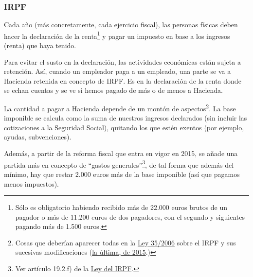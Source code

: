 \documentclass[nochap,palatino,shortheader]{apuntes}
\newcommand{\study}[1]{#1} \newcommand{\substudy}[1]{#1}
\begin{document}
\subsubsection{IRPF}

Cada año (más concretamente, cada ejercicio fiscal), las personas físicas deben hacer la declaración de la renta\footnote{Sólo es obligatorio habiendo recibido más de 22.000 euros brutos de un pagador o más de 11.200 euros de dos pagadores, con el segundo y siguientes pagando más de 1.500 euros.} y pagar un impuesto en base a los ingresos (renta) que haya tenido.

Para evitar el susto en la declaración, las actividades económicas están sujeta a retención. Así, cuando un empleador paga a un empleado, una parte se va a Hacienda retenida en concepto de IRPF\footnotemark.
Es en la declaración de la renta donde se echan cuentas y se ve si hemos pagado de más o de menos a Hacienda.


La cantidad a pagar a Hacienda depende de un montón de aspectos\footnote{Cosas que deberían aparecer todas en la \href{https://www.boe.es/buscar/act.php?id=BOE-A-2006-20764&tn=1&vd=&p=20151030}{Ley 35/2006} sobre el IRPF y sus sucesivas modificaciones (\href{http://www.boe.es/diario_boe/txt.php?id=BOE-A-2015-7765}{la última, de 2015}.)}.
La \study{base imponible} se calcula como la \substudy{suma de nuestros ingresos declarados (}\study{sin}\substudy{ incluir las cotizaciones a la }\study{Seguridad Social}), \substudy{quitando} los que estén exentos (por ejemplo, \substudy{ayudas}, subvenciones).

Además, a partir de la reforma fiscal que entra en vigor en 2015, se añade una partida más en concepto de ``gastos generales''\footnote{Ver artículo 19.2.f) de la \href{https://www.boe.es/buscar/act.php?id=BOE-A-2006-20764&b=29&tn=1&p=20141128}{Ley del IRPF}.}, de tal forma que además del mínimo, hay que \substudy{restar 2.000 euros} más de la base imponible (así que pagamos menos impuestos).
\end{document}
